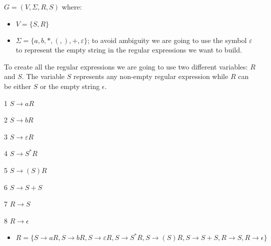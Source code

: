 \documentclass[11pt]{article}
\newcommand{\question}[2] {\vspace{0.3in}\noindent{\subsection*{Question #1. #2} \vspace{0.15in}}}
\begin{document}
\question{4}{}
$G = (V, \Sigma, R, S)$ where:
\begin{itemize}
    \item{$V = \{S, R\}$}
    \item{$\Sigma = \{a, b, *, (, ), +, \varepsilon \}$}; to avoid ambiguity we are going to use the symbol $\varepsilon$ to represent the empty string in the regular expressions we want to build.
\end{itemize}

\par To create all the regular expressions we are going to use two different variables: $R$ and $S$. The variable $S$ represents any non-empty regular expression while $R$ can be either $S$ or the empty string $\epsilon$.

\par 1 $S \rightarrow aR$
\par 2 $S \rightarrow bR$
\par 3 $S \rightarrow \varepsilon R$
\par 4 $S \rightarrow S^*R$
\par 5 $S \rightarrow (S)R$
\par 6 $S \rightarrow S + S$
\par 7 $R \rightarrow S$
\par 8 $R \rightarrow \epsilon$
\begin{itemize}    
    \item{$R = \{
        S \rightarrow aR, 
        S \rightarrow bR, 
        S \rightarrow \varepsilon R,
        S \rightarrow S^*R, 
        S \rightarrow (S)R,
        S \rightarrow S + S,
        R \rightarrow S,
        R \rightarrow \epsilon
    \}$
    }
\end{itemize}
\end{document}

